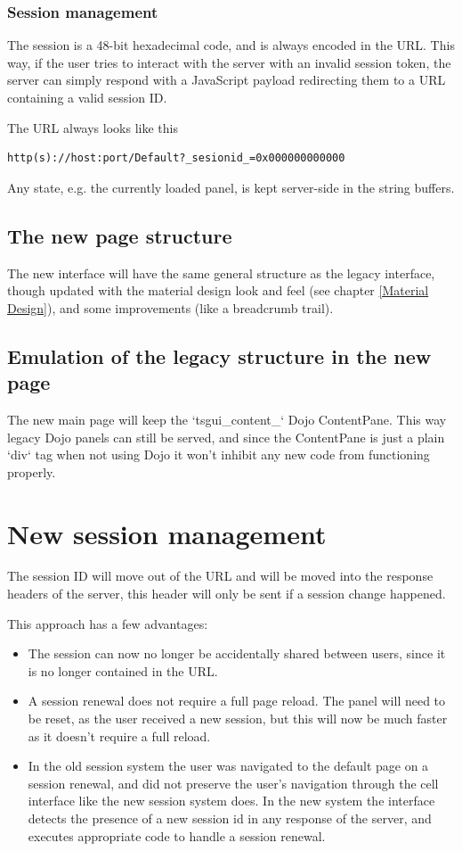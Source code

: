 \subsubsection{Session management}
The session is a 48-bit hexadecimal code, and is always encoded in the URL.
This way, if the user tries to interact with the server with an invalid session
token, the server can simply respond with a JavaScript payload redirecting them
to a URL containing a valid session ID.

The URL always looks like this
\begin{lstlisting}
http(s)://host:port/Default?_sesionid_=0x000000000000
\end{lstlisting}
Any state, e.g. the currently loaded panel, is kept server-side in the string
buffers.

\subsection{The new page structure}
The new interface will have the same general structure as the legacy interface,
though updated with the material design look and feel (see chapter \ref{Material Design}),
and some improvements (like a breadcrumb trail).

\subsection{Emulation of the legacy structure in the new page}
The new main page will keep the `tsgui\_content\_` Dojo ContentPane. This way
legacy Dojo panels can still be served, and since the ContentPane is just a plain
`div` tag when not using Dojo it won't inhibit any new code from functioning
properly.

\section{New session management}
The session ID will move out of the URL and will be moved into the response
headers of the server, this header will only be sent if a session change happened.

This approach has a few advantages:
\begin{itemize}
\item The session can now no longer be accidentally shared between users, since
it is no longer contained in the URL.
\item A session renewal does not require a full page reload. The panel will need
to be reset, as the user received a new session, but this will now be much faster
as it doesn't require a full reload.
\item In the old session system the user was navigated to the default page on a
session renewal, and did not preserve the user's navigation through the cell
interface like the new session system does.
In the new system the interface detects the presence of a new session id in any
response of the server, and executes appropriate code to handle a session renewal.
\end{itemize}

